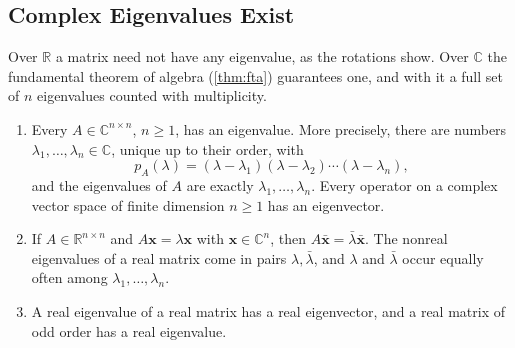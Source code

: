 \subsection{Complex Eigenvalues Exist}

Over $\mathbb R$ a matrix need not have any eigenvalue, as the rotations show. Over $\mathbb C$ the fundamental theorem of algebra (\cref{thm:fta}) guarantees one, and with it a full set of $n$ eigenvalues counted with multiplicity.

\begin{theorem}
\label{thm:eigenvalues-exist}
\leavevmode
\begin{enumerate}
\item Every $A\in\mathbb C^{n\times n}$, $n\ge1$, has an eigenvalue. More precisely, there are numbers $\lambda_1,\ldots,\lambda_n\in\mathbb C$, unique up to their order, with
\[
p_A(\lambda)=(\lambda-\lambda_1)(\lambda-\lambda_2)\cdots(\lambda-\lambda_n),
\]
and the eigenvalues of $A$ are exactly $\lambda_1,\ldots,\lambda_n$. Every operator on a complex vector space of finite dimension $n\ge1$ has an eigenvector.
\item If $A\in\mathbb R^{n\times n}$ and $A\mathbf x=\lambda\mathbf x$ with $\mathbf x\in\mathbb C^n$, then $A\bar{\mathbf x}=\bar\lambda\bar{\mathbf x}$. The nonreal eigenvalues of a real matrix come in pairs $\lambda,\bar\lambda$, and $\lambda$ and $\bar\lambda$ occur equally often among $\lambda_1,\ldots,\lambda_n$.
\item A real eigenvalue of a real matrix has a real eigenvector, and a real matrix of odd order has a real eigenvalue.
\end{enumerate}
\end{theorem}

